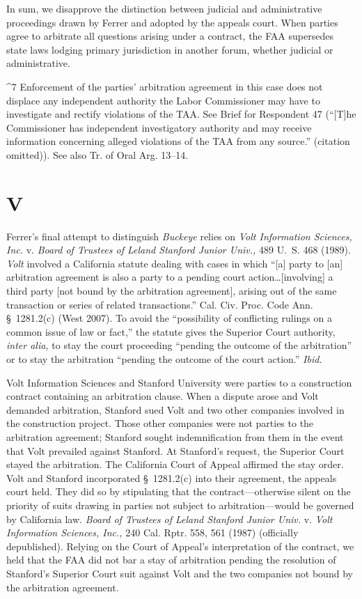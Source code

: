   In sum, we disapprove the distinction between judicial and
administrative proceedings drawn by Ferrer and adopted by the appeals
court. When parties agree to arbitrate all questions arising under a
contract, the FAA supersedes state laws lodging primary jurisdiction in
another forum, whether judicial or administrative. \newpage 

^7 Enforcement of the parties' arbitration agreement in this case
does not displace any independent authority the Labor Commissioner may
have to investigate and rectify violations of the TAA. See Brief for
Respondent 47 (``[T]he Commissioner has independent investigatory
authority and may receive information concerning alleged violations of
the TAA from any source.'' (citation omitted)). See also Tr. of Oral
Arg. 13--14.

\section{V}

  Ferrer's final attempt to distinguish \emph{Buckeye} relies on \emph{Volt
Information Sciences, Inc.} v. \emph{Board of Trustees of Leland Stanford
Junior Univ.,} 489 U.~S. 468 (1989). \emph{Volt} involved a California
statute dealing with cases in which ``[a] party to [an] arbitration
agreement is also a party to a pending court action\dots [involving]
a third party [not bound by the arbitration agreement], arising out of
the same transaction or series of related transactions.'' Cal. Civ.
Proc. Code Ann. \S~1281.2(c) (West 2007). To avoid the ``possibility
of conflicting rulings on a common issue of law or fact,'' the statute
gives the Superior Court authority, \emph{inter alia,} to stay the court
proceeding ``pending the outcome of the arbitration'' or to stay the
arbitration ``pending the outcome of the court action.'' \emph{Ibid.}

  Volt Information Sciences and Stanford University were parties to
a construction contract containing an arbitration clause. When a
dispute arose and Volt demanded arbitration, Stanford sued Volt and
two other companies involved in the construction project. Those other
companies were not parties to the arbitration agreement; Stanford
sought indemnification from them in the event that Volt prevailed
against Stanford. At Stanford's request, the Superior Court stayed
the arbitration. The California Court of Appeal affirmed the stay
order. Volt and Stanford incorporated \S~1281.2(c) into their
agreement, the appeals court held. They did so by stipulating that
the contract---otherwise silent on the priority of suits drawing in
parties not subject to arbitration---would be governed by California
law. \emph{Board of Trustees of Leland Stanford Junior Univ.} v. \emph{Volt
Information Sciences, Inc.,} 240 Cal. Rptr. 558, 561 (1987) (officially
depublished). Relying on the Court of Appeal's interpretation of the
contract, we held that the FAA did not bar a stay of arbitration pending
the resolution of Stanford's Superior Court suit against Volt and the
two companies not bound by the arbitration agreement. \newpage 



